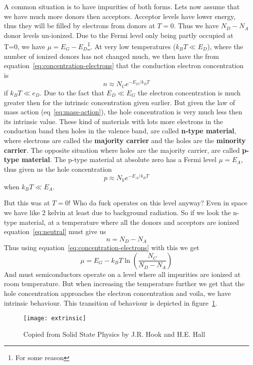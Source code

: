 \documentclass[11pt]{article}
\begin{document}
A common situation is to have impurities of both forms. Lets now assume that we have much more donors then acceptors. Acceptor levels have lower energy, thus they will be filled by electrons from donors at $T=0$. Thus we have $N_D-N_A$ donor levels un-ionized. Due to the Fermi level only being partly occupied at T=0, we have $\mu = E_G - E_D$\footnote{For some reason}. At very low temperatures ($k_B T \ll E_D$), where the number of ionized donors has not changed much, we then have the from equation~\ref{eq:concentration-electrons} that the conduction electron concentration is
\begin{equation}
	n \approx N_C e^{-E_D/k_B T}
\end{equation}
if $k_B T \ll e_D$. Due to the fact that $E_D \ll E_G$ the electron concentration is much greater then for the intrinsic concentration given earlier. But given the law of mass action (eq~\ref{eq:mass-action}), the hole concentration is very much less then its intrinsic value. These kind of materials with lots more electrons in the conduction band then holes in the valence band, are called \textbf{n-type material}, where electrons are called the \textbf{majority carrier} and the holes are the \textbf{minority carrier}. The opposite situation where holes are the majority carrier, are called \textbf{p-type material}. The p-type material at absolute zero has a Fermi level $\mu = E_A$, thus given us the hole concentration
\begin{equation}
	p \approx N_V e^{-E_A/k_B T}
\end{equation}
when $k_B T \ll E_A$. 

But this was at $T=0$! Who da fuck operates on this level anyway? Even in space we have like 2 kelvin at least due to background radiation. So if we look the n-type material, at a temperature where all the donors and acceptors are ionized equation~\ref{eq:neutral} must give us
\begin{equation}
	n = N_D - N_A 
\end{equation}
Thus using equation~\ref{eq:concentration-electrons} with this we get
\begin{equation}
	\mu = E_G - k_B T \ln{(\frac{N_C}{N_D-N_A})}
\end{equation}
And must semiconductors operate on a level where all impurities are ionized at room temperature. But when increasing the temperature further we get that the hole concentration approaches the electron concentration and voila, we have intrinsic behaviour. This transition of behaviour is depicted in figure~\ref{fig:extrinsic}.
\begin{figure}[!ht]
	\centering
	\texttt{[image: extrinsic]}
	\caption{Copied from Solid State Physics by J.R. Hook and H.E. Hall}
	\label{fig:extrinsic}
\end{figure}
\end{document}
